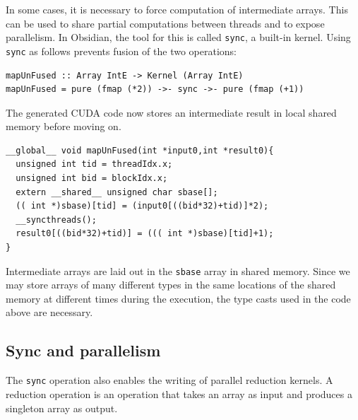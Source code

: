 \documentclass[]{sigplanconf}
\begin{document}
In some cases, it is necessary to force computation of 
intermediate arrays. This can be used to share partial computations between 
threads and to expose parallelism. In Obsidian, the tool for this
is called {\tt sync}, a built-in kernel. Using {\tt sync} as follows prevents fusion of the
two operations:
\begin{codesize} 
\begin{verbatim}
mapUnFused :: Array IntE -> Kernel (Array IntE) 
mapUnFused = pure (fmap (*2)) ->- sync ->- pure (fmap (+1))
\end{verbatim}
\end{codesize}
The generated CUDA code now stores an intermediate result in local shared
memory before moving on. 
\begin{codesize} 
\begin{verbatim}
__global__ void mapUnFused(int *input0,int *result0){
  unsigned int tid = threadIdx.x;
  unsigned int bid = blockIdx.x;
  extern __shared__ unsigned char sbase[];
  (( int *)sbase)[tid] = (input0[((bid*32)+tid)]*2);
  __syncthreads();
  result0[((bid*32)+tid)] = ((( int *)sbase)[tid]+1);
}
\end{verbatim}
\end{codesize}
Intermediate arrays are laid out in the {\tt sbase} array in shared memory. 
Since we may store arrays of many different types in the same locations 
of the shared memory at different times during the execution, the type casts
used in the code above are necessary. 

\subsection{Sync and parallelism}

The {\tt sync} operation also enables the writing of parallel reduction 
kernels. A reduction operation is an operation that takes an array as input
and
produces a singleton array as output. 
\end{document}
